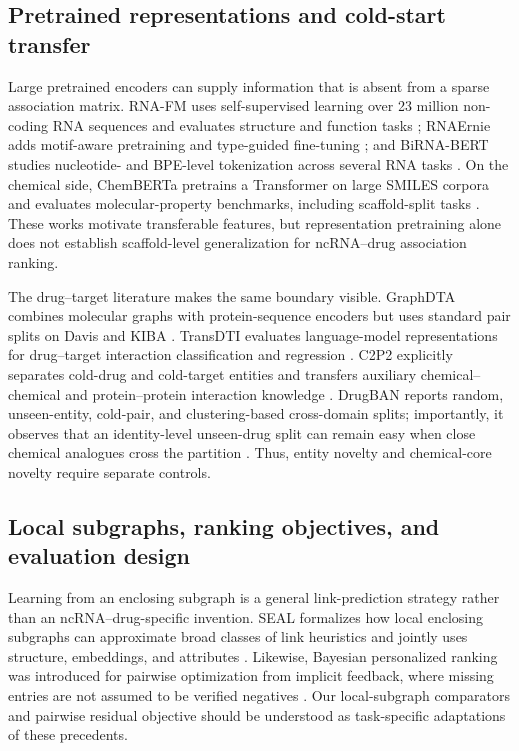 \documentclass[10pt]{article}
\begin{document}
\subsection{Pretrained representations and cold-start transfer}

Large pretrained encoders can supply information that is absent from a sparse association matrix. RNA-FM uses self-supervised learning over 23 million non-coding RNA sequences and evaluates structure and function tasks \citep{chen2022rnafm}; RNAErnie adds motif-aware pretraining and type-guided fine-tuning \citep{wang2024rnaernie}; and BiRNA-BERT studies nucleotide- and BPE-level tokenization across several RNA tasks \citep{tahmid2025birnabert}. On the chemical side, ChemBERTa pretrains a Transformer on large SMILES corpora and evaluates molecular-property benchmarks, including scaffold-split tasks \citep{chithrananda2020chemberta}. These works motivate transferable features, but representation pretraining alone does not establish scaffold-level generalization for ncRNA--drug association ranking.

The drug--target literature makes the same boundary visible. GraphDTA combines molecular graphs with protein-sequence encoders but uses standard pair splits on Davis and KIBA \citep{nguyen2021graphdta}. TransDTI evaluates language-model representations for drug--target interaction classification and regression \citep{kalakoti2022transdti}. C2P2 explicitly separates cold-drug and cold-target entities and transfers auxiliary chemical--chemical and protein--protein interaction knowledge \citep{nguyen2022coldstartdta}. DrugBAN reports random, unseen-entity, cold-pair, and clustering-based cross-domain splits; importantly, it observes that an identity-level unseen-drug split can remain easy when close chemical analogues cross the partition \citep{bai2023drugban}. Thus, entity novelty and chemical-core novelty require separate controls.

\subsection{Local subgraphs, ranking objectives, and evaluation design}

Learning from an enclosing subgraph is a general link-prediction strategy rather than an ncRNA--drug-specific invention. SEAL formalizes how local enclosing subgraphs can approximate broad classes of link heuristics and jointly uses structure, embeddings, and attributes \citep{zhang2018seal}. Likewise, Bayesian personalized ranking was introduced for pairwise optimization from implicit feedback, where missing entries are not assumed to be verified negatives \citep{rendle2009bpr}. Our local-subgraph comparators and pairwise residual objective should be understood as task-specific adaptations of these precedents.
\end{document}
